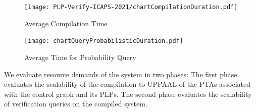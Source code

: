 \documentclass[letterpaper]{article}
\begin{document}
\begin{figure}[h]
\centering
 \texttt{[image: PLP-Verify-ICAPS-2021/chartCompilationDuration.pdf]}
\caption{Average Compilation Time}
\label{fig:compilation-time}
\end{figure}

\begin{figure}[htb!]
  \centering
  \texttt{[image: chartQueryProbabilisticDuration.pdf]}
  \caption{Average Time for Probability Query}
  \label{fig:time-prob-query}
\end{figure}


We evaluate resource demands of the system
in two phases: The first phase evaluates
the scalability of the compilation to UPPAAL of the  PTAs associated
with the control graph and its PLPs.
The second phase evaluates the scalability of
verification queries on the
compiled system.
\end{document}
